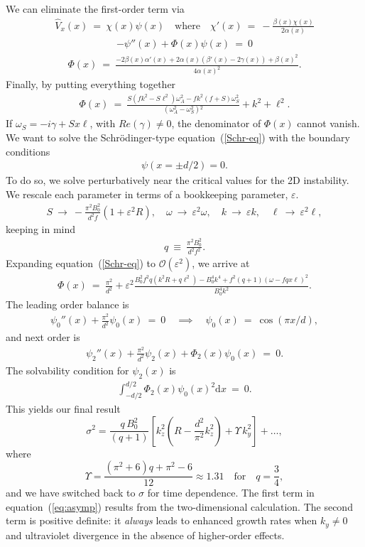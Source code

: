 \documentclass[openacc]{rsproca_new}%
\newcommand\Beq{\begin{eqnarray}}
\newcommand\Eeq{\end{eqnarray}}
\newcommand{\eps}{\varepsilon}
\begin{document}
We can eliminate the first-order term via
\Beq
\hat{V}_{x}(x) \ = \ \chi(x) \psi(x) \quad \text{where} \quad \chi'(x) \  = \ -\frac{\beta (x) \chi (x)}{2 \alpha (x)}
\Eeq
\Beq
-\psi''(x) + \Phi(x) \psi(x) \ = \ 0 \label{Schr-eq}
\Eeq
\Beq
\Phi(x)  \ = \ \frac{-2 \beta (x) \alpha '(x)+2 \alpha (x)
   \left(\beta '(x)-2 \gamma (x)\right)+\beta
   (x)^2}{4 \alpha (x)^2}.
\Eeq
Finally, by putting everything together 
\Beq
\Phi(x) \ = \ \frac{S  \left(f k^2-S \ell
   ^2\right) \omega _A^2 -f k^2 (f+S) \omega
   _S^2}{\left(\omega _A^2-\omega
   _S^2\right){}^2} + k^{2} + \ell^{2}.
\Eeq
If $\omega_{S}=-i \gamma+Sx\ell$, with $Re(\gamma)\neq0$, the denominator of $\Phi(x)$ cannot vanish. 
We want to solve the Schr\"{o}dinger-type equation~(\ref{Schr-eq}) with the boundary conditions 
\Beq
\psi(x=\pm d/2) = 0.
\Eeq
To do so, we solve perturbatively near the critical values for the 2D instability. We rescale each parameter in terms of a bookkeeping parameter, $\eps$.
\Beq
S  \ \to \  - \frac{\pi ^2 B_{0}^2}{d^2 f} ( 1 + \eps^{2} R), \quad \omega \ \to \ \eps^{2} \omega , \quad k \ \to \ \eps k, \quad \ell \ \to \ \eps^{2} \ell,
\Eeq 
keeping in mind
\Beq
q  \ \equiv  \ \frac{\pi ^2 B_{0}^2}{d^2 f^{2}}.
\Eeq
Expanding equation~(\ref{Schr-eq}) to $\mathcal{O}(\eps^{2})$, we arrive at
\Beq
\Phi(x) \ = \ \frac{\pi^{2}}{d^{2}} + \eps^{2} \frac{B_{0}^2 f^2 q \left(k^2 R+q
   \ell ^2\right) - B_{0}^4 k^4 +f^2 (q+1) (\omega -f q x \ell
   )^2  }{B_{0}^4 k^2}.
\Eeq
The leading order balance is
\Beq
\psi_{0}''(x) + \frac{\pi^{2}}{d^{2}}  \psi_{0}(x) \ = \ 0  \quad \implies \quad \psi_{0}(x) \ = \ \cos(\pi x / d),
\Eeq
and next order is
\Beq
\psi_{2}''(x) + \frac{\pi^{2}}{d^{2}}  \psi_{2}(x) + \Phi_{2}(x)\psi_{0}(x)\ = \ 0.
\Eeq
The solvability condition for $\psi_{2}(x)$ is 
\Beq
\int_{-d/2}^{d/2} \Phi_{2}(x)\psi_{0}(x)^{2} \text{d} x \ = \ 0.
\Eeq
This yields our final result
\begin{equation}\label{eq:asymp}
\sigma^{2}=\frac{q\,B_{0}^{2}}{(q+1)}\left[ k_{z}^{2}\left(R-\frac{d^2}{\pi^{2}}k_{z}^{2}\right)+\Upsilon\,k_{y}^{2}\right]+\ldots,
\end{equation}
where
\begin{equation}
\Upsilon=\frac{\left(\pi^{2}+6\right) q+\pi^{2}-6}{12}\approx1.31\quad\text{for}\quad{q}=\frac{3}{4},
\end{equation}
and we have switched back to $\sigma$ for time dependence.
The first term in equation~(\ref{eq:asymp}) results from the two-dimensional calculation.
The second term is positive definite: it \emph{always} leads to enhanced growth rates when $k_{y}\neq0$ and ultraviolet divergence in the absence of higher-order effects.
\end{document}
